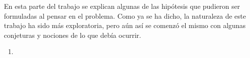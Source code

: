 En esta parte del trabajo se explican algunas de las hip\'otesis
que pudieron ser formuladas al pensar en el problema. Como ya se ha dicho, la
naturaleza de este trabajo ha sido m\'as exploratoria, pero a\'un as\'i se
comenz\'o el mismo con algunas conjeturas y nociones de lo que deb\'ia ocurrir.

\begin{enumerate}
    \item{}
\end{enumerate}
